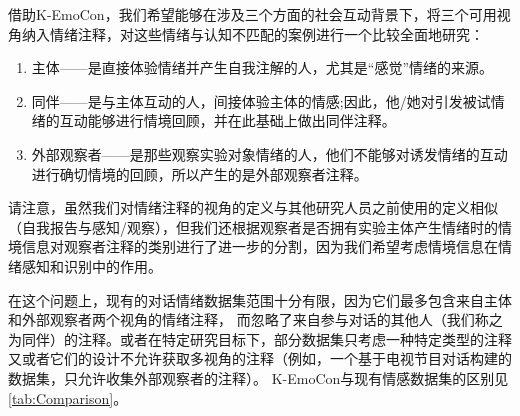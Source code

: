 借助K-EmoCon，我们希望能够在涉及三个方面的社会互动背景下，将三个可用视角纳入情绪注释，对这些情绪与认知不匹配的案例进行一个比较全面地研究：
\begin{enumerate}
    \item 主体——是直接体验情绪并产生自我注解的人，尤其是“感觉”情绪的来源。
    \item 同伴——是与主体互动的人，间接体验主体的情感;因此，他/她对引发被试情绪的互动能够进行情境回顾，并在此基础上做出同伴注释。
    \item 外部观察者——是那些观察实验对象情绪的人，他们不能够对诱发情绪的互动进行确切情境的回顾，所以产生的是外部观察者注释。
    \end{enumerate}

请注意，虽然我们对情绪注释的视角的定义与其他研究人员之前使用的定义相似（自我报告与感知/观察），但我们还根据观察者是否拥有实验主体产生情绪时的情境信息对观察者注释的类别进行了进一步的分割，因为我们希望考虑情境信息在情绪感知和识别中的作用。

在这个问题上，现有的对话情绪数据集范围十分有限，因为它们最多包含来自主体和外部观察者两个视角的情绪注释，
而忽略了来自参与对话的其他人（我们称之为同伴）的注释。或者在特定研究目标下，部分数据集只考虑一种特定类型的注释
又或者它们的设计不允许获取多视角的注释（例如，一个基于电视节目对话构建的数据集，只允许收集外部观察者的注释）。
K-EmoCon与现有情感数据集的区别见\autoref{tab:Comparison}。

